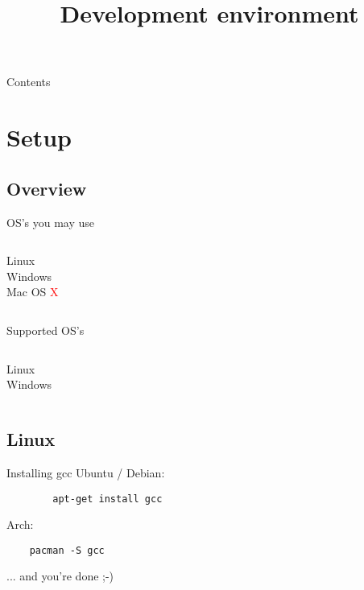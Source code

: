 
\newcommand{\topic}{
	Development environment
}


\title{\topic}
\supertitle{\course}
\date{}



\maketitle

\begin{frame}{Contents}
	\tableofcontents
\end{frame}

\section{Setup}
\subsection{Overview}
\begin{frame}{OS's you may use}
	\begin{columns}[T]
		Linux\\
		\uncover<2->{\textcolor{green}{recommended}}
		Windows\\
		\uncover<3->{\textcolor{orange}{supported}}
		Mac OS \textcolor<4->{red}{X}
	\end{columns}
\end{frame}
\begin{frame}{Supported OS's}
	\begin{columns}[T]
		Linux\\
		Windows\\
	\end{columns}
\end{frame}
\subsection{Linux}
\begin{frame}[fragile]{Installing gcc}
	Ubuntu / Debian: 
	\begin{lstlisting}
		apt-get install gcc
	\end{lstlisting}
	Arch:
	\begin{lstlisting}
	pacman -S gcc
	\end{lstlisting}
	... and you're done ;-)
\end{frame}
